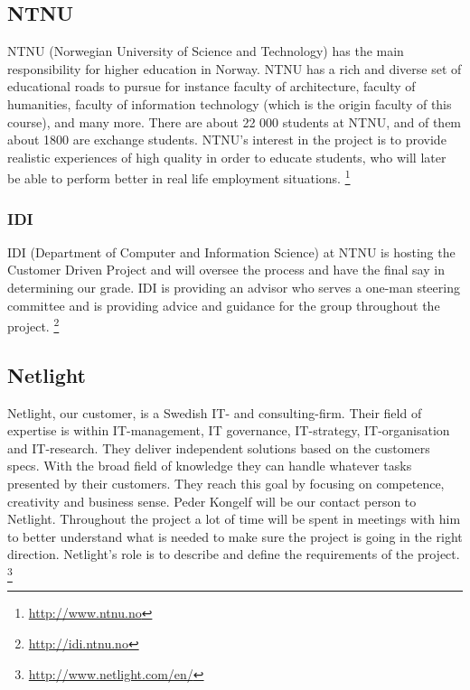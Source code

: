 \subsection{NTNU}
\label{NTNU}
NTNU (Norwegian University of Science and Technology) has the main responsibility for higher education in Norway. NTNU has a rich and diverse set of educational roads to pursue for instance faculty of architecture, faculty of humanities, faculty of information technology (which is the origin faculty of this course), and many more. There are about 22 000 students at NTNU, and of them about 1800 are exchange students. NTNU’s interest in the project is to provide realistic experiences of high quality in order to educate students, who will later be able to perform better in real life employment situations.
\footnote{\url{http://www.ntnu.no}}

\subsubsection{IDI}
IDI (Department of Computer and Information Science) at NTNU is hosting the Customer Driven Project and will oversee the process and have the final say in determining our grade. IDI is providing an advisor who serves a one-man steering committee and is providing advice and guidance for the group throughout the project.
\footnote{\url{http://idi.ntnu.no}}

\subsection{Netlight}
Netlight, our customer, is a Swedish IT- and consulting-firm. Their field of expertise is within IT-management, IT governance, IT-strategy, IT-organisation and IT-research. They deliver independent solutions based on the customers specs. With the broad field of knowledge they can handle whatever tasks presented by their customers. They reach this goal by focusing on competence, creativity and business sense. 
Peder Kongelf will be our contact person to Netlight. Throughout the project a lot of time will be spent in meetings with him to better understand what is needed to make sure the project is going in the right direction. Netlight's role is to describe and define the requirements of the project.
\footnote{\url{http://www.netlight.com/en/}}


